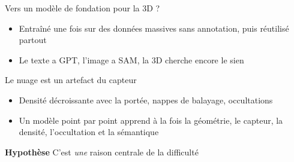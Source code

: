 \documentclass[A4,svgnames,10pt,aspectratio=169,usepdftitle=false]{beamer}
\begin{document}
\begin{frame}{Vers un modèle de fondation pour la 3D ?}
    \begin{center}
        \resizebox{0.86\textwidth}{!}{}
    \end{center}

    \vfill
    \begin{itemize}
        \item Entraîné une fois sur des données massives sans annotation, puis réutilisé partout
        \item Le texte a GPT, l'image a SAM, la 3D cherche encore le sien
    \end{itemize}
\end{frame}

\begin{frame}{Le nuage est un artefact du capteur}
    \begin{center}
        \resizebox{0.66\textwidth}{!}{}
    \end{center}

    \vfill
    \begin{itemize}
        \item Densité décroissante avec la portée, nappes de balayage, occultations
        \item Un modèle point par point apprend à la fois la géométrie, le capteur, la densité, l'occultation et la sémantique
    \end{itemize}

    \vfill
    \textbf{\orange Hypothèse} C'est \emph{une} raison centrale de la difficulté
\end{frame}
\end{document}
